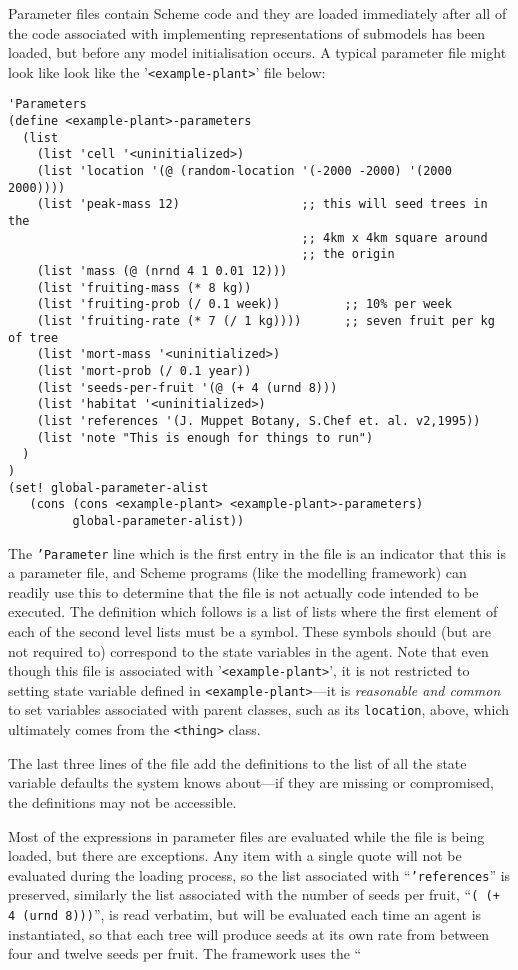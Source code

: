 Parameter files contain \textsf{Scheme} code and they are loaded
immediately after all of the code associated with implementing
representations of submodels has been loaded, but before any model
initialisation occurs.  A typical parameter file might look
like look like the '\texttt{<example-plant>}' file below:
\begin{verbatim}
'Parameters
(define <example-plant>-parameters
  (list
    (list 'cell '<uninitialized>)
    (list 'location '(@ (random-location '(-2000 -2000) '(2000 2000))))
    (list 'peak-mass 12)                 ;; this will seed trees in the
                                         ;; 4km x 4km square around
                                         ;; the origin
    (list 'mass (@ (nrnd 4 1 0.01 12)))
    (list 'fruiting-mass (* 8 kg))
    (list 'fruiting-prob (/ 0.1 week))         ;; 10% per week
    (list 'fruiting-rate (* 7 (/ 1 kg))))      ;; seven fruit per kg of tree
    (list 'mort-mass '<uninitialized>)
    (list 'mort-prob (/ 0.1 year))
    (list 'seeds-per-fruit '(@ (+ 4 (urnd 8)))
    (list 'habitat '<uninitialized>)
    (list 'references '(J. Muppet Botany, S.Chef et. al. v2,1995))
    (list 'note "This is enough for things to run")
  )
)
(set! global-parameter-alist 
   (cons (cons <example-plant> <example-plant>-parameters) 
         global-parameter-alist))
\end{verbatim}
The \texttt{'Parameter} line which is the first entry in the file is
an indicator that this is a parameter file, and \textsf{Scheme}
programs (like the modelling framework) can readily use this to
determine that the file is not actually code intended to be executed.
The definition which follows is a list of lists where the first
element of each of the second level lists must be a symbol.  These
symbols should (but are not required to) correspond to the state
variables in the agent. Note that even though this file is associated
with '\texttt{<example-plant>}', it is not restricted to setting state
variable defined in \texttt{<example-plant>}---it is \emph{reasonable
  and common} to set variables associated with parent classes, such as
its \texttt{location}, above, which ultimately comes from the \texttt{<thing>}
class.

The last three lines of the file add the definitions to the list of
all the state variable defaults the system knows about---if they are
missing or compromised, the definitions may not be accessible.

Most of the expressions in parameter files are evaluated while the
file is being loaded, but there are exceptions.  Any item with a
single quote will not be evaluated during the loading process, so the
list associated with ``\texttt{'references}'' is preserved, similarly
the list associated with the number of seeds per fruit, ``\texttt{(\at
  (+ 4 (urnd 8)))}'', is read verbatim, but will be evaluated each
time an agent is instantiated, so that each tree will produce seeds at
its own rate from between four and twelve seeds per fruit.  The
framework uses the ``\texttt{\at}

